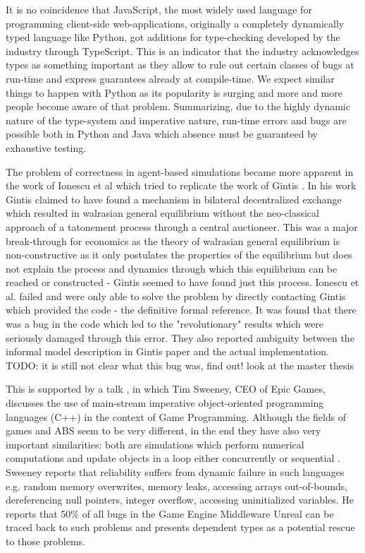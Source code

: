 It is no coincidence that JavaScript, the most widely used language for programming client-side web-applications, originally a completely dynamically typed language like Python, got additions for type-checking developed by the industry through TypeScript. This is an indicator that the industry acknowledges types as something important as they allow to rule out certain classes of bugs at run-time and express guarantees already at compile-time. We expect similar things to happen with Python as its popularity is surging and more and more people become aware of that problem. Summarizing, due to the highly dynamic nature of the type-system and imperative nature, run-time errors and bugs are possible both in Python and Java which absence must be guaranteed by exhaustive testing. 

The problem of correctness in agent-based simulations became more apparent in the work of Ionescu et al \cite{ionescu_dependently-typed_2012} which tried to replicate the work of Gintis \cite{gintis_emergence_2006}. In his work Gintis claimed to have found a mechanism in bilateral decentralized exchange which resulted in walrasian general equilibrium without the neo-classical approach of a tatonement process through a central auctioneer. This was a major break-through for economics as the theory of walrasian general equilibrium is non-constructive as it only postulates the properties of the equilibrium \cite{colell_microeconomic_1995} but does not explain the process and dynamics through which this equilibrium can be reached or constructed - Gintis seemed to have found just this process. Ionescu et al. \cite{ionescu_dependently-typed_2012} failed and were only able to solve the problem by directly contacting Gintis which provided the code - the definitive formal reference. It was found that there was a bug in the code which led to the "revolutionary" results which were seriously damaged through this error. They also reported ambiguity between the informal model description in Gintis paper and the actual implementation. TODO: it is still not clear what this bug was, find out! look at the master thesis 

This is supported by a talk \cite{sweeney_next_2006}, in which Tim Sweeney, CEO of Epic Games, discusses the use of main-stream imperative object-oriented programming languages (C++) in the context of Game Programming. Although the fields of games and ABS seem to be very different, in the end they have also very important similarities: both are simulations which perform numerical computations and update objects in a loop either concurrently or sequential \cite{gregory_game_2018}. Sweeney reports that reliability suffers from dynamic failure in such languages e.g. random memory overwrites, memory leaks, accessing arrays out-of-bounds, dereferencing null pointers, integer overflow, accessing uninitialized variables. He reports that 50\% of all bugs in the Game Engine Middleware Unreal can be traced back to such problems and presents dependent types as a potential rescue to those problems.

